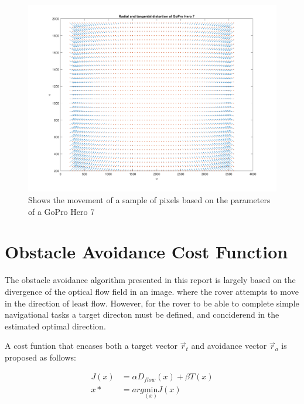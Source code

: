 \documentclass{UoNMCHA}
\numberwithin{equation}{section}
\begin{document}
\newpage
\begin{figure}[ht]
    \begin{center}
        \includegraphics[width=1\linewidth]{Figures/Matlab/DistortionMovement}
        \caption{Shows the movement of a sample of pixels based on the parameters of a GoPro Hero 7}
        \label{fig:DistortionMovement}
    \end{center}
\end{figure}

\newpage
\section{Obstacle Avoidance Cost Function}
The obstacle avoidance algorithm presented in this report is largely based on the divergence of the optical flow field in an image. where the rover attempts to move in the direction of least flow. However, for the rover to be able to complete simple navigational tasks a target directon must be defined, and conciderend in the estimated optimal direction.

A cost funtion that encases both a target vector $\vec{r}_{t}$ and avoidance vector $\vec{r}_{a}$ is proposed as follows:

\begin{equation}
	\begin{split}
		J(x) &= \alpha D_{flow}(x) + \beta T(x)\\
		x* &= arg\underset{(x)}{\mathrm{min}}J(x)
	\end{split}
\end{equation}
\end{document}
